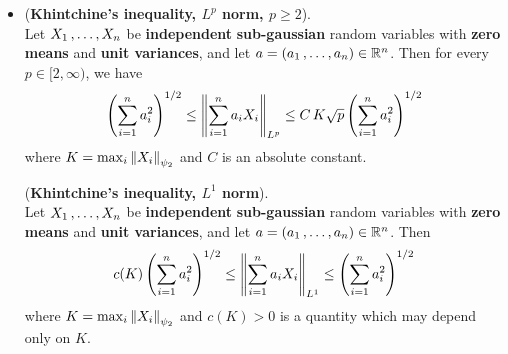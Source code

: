 \documentclass[11pt]{article}
\begin{document}
\begin{itemize}
\item \begin{proposition} (\textbf{Khintchine's inequality, $L^p$ norm, $p \ge 2$}).  \citep{vershynin2018high} \\
Let $X_1 \,{,}\ldots{,}\, X_n$ be \textbf{independent} \textbf{sub-gaussian} random variables with \textbf{zero means} and \textbf{unit variances}, and let $a = (a_1 \,{,}\ldots{,}\, a_n) \in {\mathbb R}^{n}$. Then for every $p \in [2, \infty)$, we have
\begin{align}
\left(\sum_{i=1}^{n}a_i^2\right)^{1/2} \le \left\|\sum_{i=1}^{n}a_i X_i\right\|_{L^p}  \le C\,K \sqrt{p} \left(\sum_{i=1}^{n}a_i^2\right)^{1/2} \label{ineqn: khintchine_inequality_1}
\end{align}
where $K = \max_i \left\|X_i\right\|_{\psi_2}$ and $C$ is an absolute constant.
\end{proposition}

 \begin{proposition} (\textbf{Khintchine's inequality, $L^1$ norm}).  \citep{vershynin2018high} \\
Let $X_1 \,{,}\ldots{,}\, X_n$ be \textbf{independent} \textbf{sub-gaussian} random variables with \textbf{zero means} and \textbf{unit variances}, and let $a = (a_1 \,{,}\ldots{,}\, a_n) \in {\mathbb R}^{n}$. Then 
\begin{align}
c(K)\left(\sum_{i=1}^{n}a_i^2\right)^{1/2} \le \left\|\sum_{i=1}^{n}a_i X_i\right\|_{L^1}  \le \left(\sum_{i=1}^{n}a_i^2\right)^{1/2} \label{ineqn: khintchine_inequality_2}
\end{align}
where $K = \max_i \left\|X_i\right\|_{\psi_2}$ and $c(K) > 0$ is a quantity which may depend only on $K$.
\end{proposition}

\end{itemize}
\end{document}
